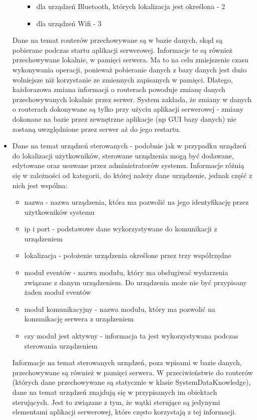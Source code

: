 \begin{itemize}
\begin{itemize}
\begin{itemize}
			\item dla urządzeń Bluetooth, których lokalizacja jest określona - 2
			\item dla urządzeń Wifi - 3
		\end{itemize}
	\end{itemize}
	Dane na temat routerów przechowywane są w bazie danych, skąd są pobierane podczas startu aplikacji serwerowej. Informacje te są również przechowywane lokalnie, w pamięci serwera. Ma to na celu zmiejszenie czasu wykonywania operacji, ponieważ pobieranie danych z bazy danych jest dużo wolniejsze niż korzystanie ze zmiennych zapisanych w pamięci. Dlatego, każdorazowa zmiana informacji o routerach powoduje zmianę danych przechowywanych lokalnie przez serwer. System zakłada, że zmiany w danych o routerach dokonywane są tylko przy użyciu aplikacji serwerowej - zmiany dokonane na bazie przez zewnętrzne aplikacje (np GUI bazy danych) nie zostaną uwzględnione przez serwer aż do jego restartu.
	\item Dane na temat urządzeń sterowanych - podobnie jak w przypadku urządzeń do lokalizacji użytkowników, sterowane urządzenia mogą być dodawane, edytowane oraz usuwane przez administratorów systemu. Informacje różnią się w zależności od kategorii, do której należy dane urządzenie, jednak część z nich jest wspólna:
	\begin{itemize}
		\item nazwa - nazwa urządzenia, która ma pozwolić na jego identyfikację przez użytkowników systemu
		\item ip i port - podstawowe dane wykorzystywane do komunikacji z urządzeniem
		\item lokalizacja - położenie urządzenia określone przez trzy współrzędne
		\item moduł eventów - nazwa modułu, który ma obsługiwać wydarzenia związane z danym urządzeniem. Do urządzenia może nie być przypisany żaden moduł eventów
		\item moduł komunikacyjny - nazwa modułu, który ma pozwolić na komunikację serwera z urządzeniem
		\item czy moduł jest aktywny - informacja ta jest wykorzystywana podczas sterowania urządzeniem 
	\end{itemize}
	Informacje na temat sterowanych urządzeń, poza wpisami w bazie danych, przechowywane są również w pamięci serwera. W przeciwieństwie do routerów (których dane przechowywane są statycznie w klasie SystemDataKnowledge), dane na temat urządzeń znajdują się w przypisanych im obiektach sterujących. Jest to związane z tym, że wątki sterujące są jedynymi elementami aplikacji serwerowej, które często korzystają z tej informacji.\\

\end{itemize}
